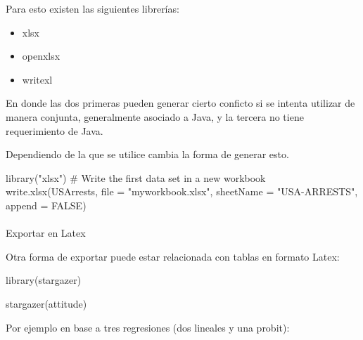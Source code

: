 \documentclass[
  letterpaper,
  DIV=11,
  numbers=noendperiod]{scrartcl}
\makeatletter
\let\oldparagraph\paragraph
\renewcommand{\paragraph}{
    \@ifstar
      \xxxParagraphStar
      \xxxParagraphNoStar
  }
\newcommand{\xxxParagraphStar}[1]{\oldparagraph*{#1}\mbox{}}
\newcommand{\xxxParagraphNoStar}[1]{\oldparagraph{#1}\mbox{}}
\newenvironment{Shaded}{\begin{snugshade}}{\end{snugshade}}
\newcommand{\AttributeTok}[1]{\textcolor[rgb]{0.40,0.45,0.13}{#1}}
\newcommand{\CommentTok}[1]{\textcolor[rgb]{0.37,0.37,0.37}{#1}}
\newcommand{\ConstantTok}[1]{\textcolor[rgb]{0.56,0.35,0.01}{#1}}
\newcommand{\FunctionTok}[1]{\textcolor[rgb]{0.28,0.35,0.67}{#1}}
\newcommand{\NormalTok}[1]{\textcolor[rgb]{0.00,0.23,0.31}{#1}}
\newcommand{\StringTok}[1]{\textcolor[rgb]{0.13,0.47,0.30}{#1}}
\providecommand{\tightlist}{%
  \setlength{\itemsep}{0pt}\setlength{\parskip}{0pt}}
\makeatother
\begin{document}
Para esto existen las siguientes librerías:

\begin{itemize}
\tightlist
\item
  xlsx
\item
  openxlsx
\item
  writexl
\end{itemize}

En donde las dos primeras pueden generar cierto conficto si se intenta
utilizar de manera conjunta, generalmente asociado a Java, y la tercera
no tiene requerimiento de Java.

Dependiendo de la que se utilice cambia la forma de generar esto.

\begin{Shaded}
\begin{Highlighting}[]
\FunctionTok{library}\NormalTok{(}\StringTok{"xlsx"}\NormalTok{)}
\CommentTok{\# Write the first data set in a new workbook}
\FunctionTok{write.xlsx}\NormalTok{(USArrests, }\AttributeTok{file =} \StringTok{"myworkbook.xlsx"}\NormalTok{,}
      \AttributeTok{sheetName =} \StringTok{"USA{-}ARRESTS"}\NormalTok{, }\AttributeTok{append =} \ConstantTok{FALSE}\NormalTok{)}
\end{Highlighting}
\end{Shaded}

\paragraph{Exportar en Latex}\label{exportar-en-latex}

Otra forma de exportar puede estar relacionada con tablas en formato
Latex:

\begin{Shaded}
\begin{Highlighting}[]
\FunctionTok{library}\NormalTok{(stargazer)}

\FunctionTok{stargazer}\NormalTok{(attitude)}
\end{Highlighting}
\end{Shaded}

Por ejemplo en base a tres regresiones (dos lineales y una probit):
\end{document}
